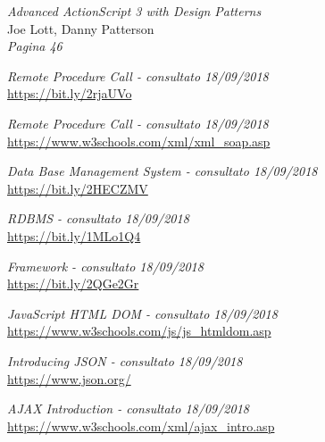 \begin{thebibliography}{99}
	\textit{Advanced ActionScript 3 with Design Patterns}\\
	Joe Lott, Danny Patterson\\
	\textit{Pagina 46}

	\textit{Remote Procedure Call - consultato 18/09/2018}\\
	\url{https://bit.ly/2rjaUVo}

	\textit{Remote Procedure Call - consultato 18/09/2018}\\
	\url{https://www.w3schools.com/xml/xml_soap.asp}	

	\textit{Data Base Management System - consultato 18/09/2018}\\
	\url{https://bit.ly/2HECZMV}

	\textit{RDBMS - consultato 18/09/2018}\\
	\url{https://bit.ly/1MLo1Q4}
	
	\textit{Framework - consultato 18/09/2018}\\
	\url{https://bit.ly/2QGe2Gr}
	

	\textit{JavaScript HTML DOM - consultato 18/09/2018}\\
	\url{https://www.w3schools.com/js/js_htmldom.asp}	
	

	\textit{Introducing JSON - consultato 18/09/2018}\\
	\url{https://www.json.org/}


	\textit{AJAX Introduction - consultato 18/09/2018}\\
	\url{https://www.w3schools.com/xml/ajax_intro.asp}
	
\end{thebibliography}


